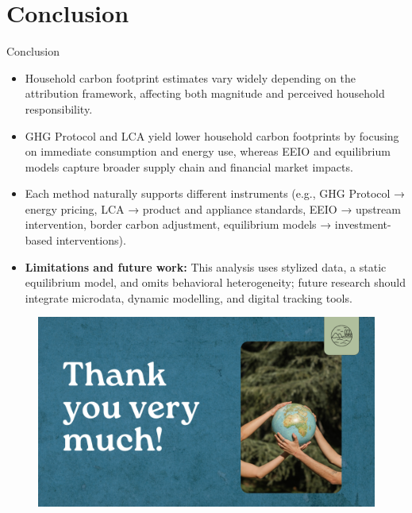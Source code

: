 \documentclass{beamer}
\begin{document}
\section{Conclusion}
\begin{frame}{Conclusion}
  \vspace{-2.5em}
\footnotesize
\begin{itemize}
\item Household carbon footprint estimates vary widely depending on the attribution framework, affecting both magnitude and perceived household responsibility.
\item GHG Protocol and LCA yield lower household carbon footprints by focusing on immediate consumption and energy use, whereas EEIO and equilibrium models capture broader supply chain and financial market impacts.
\item Each method naturally supports different instruments (e.g., GHG Protocol → energy pricing, LCA → product and appliance standards, EEIO → upstream intervention, border carbon adjustment, equilibrium models → investment-based interventions).
   \end{itemize}
\begin{itemize}
\item \textbf{Limitations and future work: }This analysis uses stylized data, a static equilibrium model, and omits behavioral heterogeneity; future research should integrate microdata, dynamic modelling, and digital tracking tools.
\end{itemize}
  \end{frame}

  \begin{frame}{}
  
\begin{figure}
\includegraphics[width=\linewidth]{Thank you.png}
\end{figure}
\end{frame}
\end{document}
